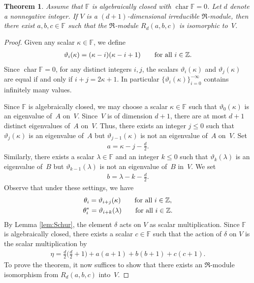 \documentclass[11pt]{article}
\numberwithin{equation}{section}
\def\F{\mathbb F}
\def\Z{\mathbb Z}
\numberwithin{equation}{section}
\newtheorem{Theorem}{Theorem}[section]
\begin{document}
\begin{Theorem}\label{thm:surjective}Assume that $\F$ is algebraically closed with $\operatorname{char}\F=0$. Let $d$ denote a nonnegative integer. If $V$ is a $(d + 1)$-dimensional irreducible $\Re$-module, then there exist $a, b, c \in \F$ such that the $\Re$-module $R_d(a, b, c)$ is isomorphic to~$V$.
\end{Theorem}
\begin{proof}Given any scalar $\kappa \in \F$, we define
\begin{gather*}
\vartheta_i(\kappa)
=(\kappa-i)(\kappa-i+1)
\qquad
\hbox{for all $i\in \Z$}.
\end{gather*}
Since $\operatorname{char}\F=0$, for any distinct integers $i,j$, the scalars $\vartheta_i(\kappa)$ and $\vartheta_j(\kappa)$ are equal if and only if $i+j=2\kappa+1$. In particular $\{\vartheta_i(\kappa)\}_{i=0}^{-\infty}$ contains infinitely many values.

Since $\F$ is algebraically closed, we may choose a scalar $\kappa\in \F$ such that $\vartheta_0(\kappa)$ is an eigenvalue of~$A$ on~$V$. Since~$V$ is of dimension $d+1$, there are at most $d+1$ distinct eigenvalues of~$A$ on~$V$. Thus, there exists an integer $j\leq 0$ such that $\vartheta_j(\kappa)$ is an eigenvalue of~$A$ but $\vartheta_{j-1}(\kappa)$ is not an eigenvalue of~$A$ on~$V$. Set
\begin{gather*}
a=\kappa-j-\tfrac{d}{2}.
\end{gather*}
Similarly, there exists a scalar $\lambda\in \F$ and an integer $k\leq 0$ such that $\vartheta_k(\lambda)$ is an eigenvalue of~$B$ but $\vartheta_{k-1}(\lambda)$ is not an eigenvalue of~$B$ in~$V$. We set
\begin{gather*}
b=\lambda-k-\tfrac{d}{2}.
\end{gather*}
Observe that under these settings, we have
\begin{gather}
\theta_i = \vartheta_{i+j}(\kappa) \qquad\hbox{for all $i\in \Z$},\label{setting:a}\\
\theta_i^* = \vartheta_{i+k}(\lambda)\qquad\hbox{for all $i\in \Z$}.\label{setting:b}
\end{gather}
By Lemma \ref{lem:Schur}, the element $\delta$ acts on $V$ as scalar multiplication. Since $\F$ is algebraically closed, there exists a scalar $c\in \F$ such that the action of $\delta$ on $V$ is the scalar multiplication by
\begin{gather*}
\eta=\textstyle\frac{d}{2}\big(\frac{d}{2}+1\big)+a(a+1)+b(b+1)+c(c+1).
\end{gather*}
To prove the theorem, it now suffices to show that there exists an $\Re$-module isomorphism from $R_d(a,b,c)$ into~$V$.


\end{proof}
\end{document}
